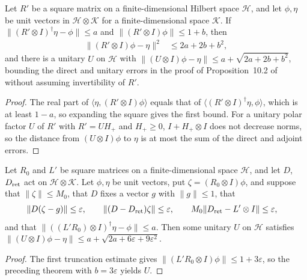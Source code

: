 \begin{lemma}
    \label{thm:area_law_amplification_unitary_error}
    \leanok
    Let $R'$ be a square matrix on a finite-dimensional Hilbert space
    $\mathcal H$, and let $\phi,\eta$ be unit vectors in
    $\mathcal H\otimes\mathcal K$ for a finite-dimensional space $\mathcal K$.
    If $\|(R'\otimes I)^\dagger\eta-\phi\|\le a$ and
    $\|(R'\otimes I)\phi\|\le1+b$, then
    \begin{align*}
        \|(R'\otimes I)\phi-\eta\|^2 & \le2a+2b+b^2,
    \end{align*}
    and there is a unitary $U$ on $\mathcal H$ with
    $\|(U\otimes I)\phi-\eta\|\le a+\sqrt{2a+2b+b^2}$, bounding the direct and unitary errors in the proof of
    Proposition~10.2 of \cite{OpenAI2026AreaLaw} without assuming invertibility of
    $R'$.
\end{lemma}
\begin{proof}
    \leanok
    The real part of $\langle\eta,(R'\otimes I)\phi\rangle$ equals that of
    $\langle(R'\otimes I)^\dagger\eta,\phi\rangle$, which is at least $1-a$,
    so expanding the square gives the first bound. For a unitary polar
    factor $U$ of $R'$ with $R'=UH_+$ and $H_+\ge0$, $I+H_+\otimes I$
    does not decrease norms, so the distance from $(U\otimes I)\phi$ to $\eta$ is at
    most the sum of the direct and adjoint errors.
\end{proof}

\begin{lemma}
    \label{thm:area_law_amplification_unitary_of_good_realization}
    \leanok
    Let $R_0$ and $L'$ be square matrices on a finite-dimensional space
    $\mathcal H$, and let $D$, $D_{\rm ret}$ act on $\mathcal H\otimes\mathcal K$.
    Let $\phi,\eta$ be unit vectors, put $\zeta=(R_0\otimes I)\phi$, and suppose
    that $\|\zeta\|\le M_0$, that $D$ fixes a vector $g$ with $\|g\|\le1$, that
    \begin{align*}
        \|D(\zeta-g)\| & \le\varepsilon,
        \qquad
        \|(D-D_{\rm ret})\zeta\|\le\varepsilon,
        \qquad
        M_0\|D_{\rm ret}-L'\otimes I\|\le\varepsilon,
    \end{align*}
    and that $\|((L'R_0)\otimes I)^\dagger\eta-\phi\|\le a$. Then some unitary
    $U$ on $\mathcal H$ satisfies
    $\|(U\otimes I)\phi-\eta\|\le a+\sqrt{2a+6\varepsilon+9\varepsilon^2}$.
\end{lemma}
\begin{proof}
    \leanok
    The first truncation estimate gives $\|(L'R_0\otimes I)\phi\|\le1+3\varepsilon$,
    so the preceding theorem with $b=3\varepsilon$ yields $U$.
\end{proof}
